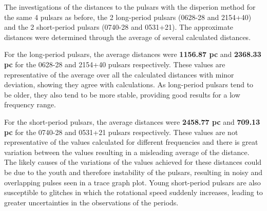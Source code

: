 \documentclass[12pt]{article}
\begin{document}
The investigations of the distances to the pulsars with the disperion method for the same 4 pulsars as before, the 2 long-period pulsars (0628-28 and 2154+40) and the 2 short-period pulsars (0740-28 and 0531+21). The approximate distances were determined through the average of several
calculated distances. 

For the long-period pulsars, the average distances were \textbf{1156.87 pc} and \textbf{2368.33 pc} for the 0628-28 and 2154+40 pulsars respectively. These values are representative of the average over all the calculated distances with minor deviation, showing they agree with calculations. As long-period pulsars tend to be older,
they also tend to be more stable, providing good results for a low frequency range.

For the short-period pulsars, the average distances were \textbf{2458.77 pc} and \textbf{709.13 pc} for the 0740-28 and 0531+21 pulsars respectively. These values are not representative of the values calculated for different frequencies and there is great variation between the values resulting in a misleading average of the distance.
The likely causes of the variations of the values achieved for these distances could be due to the youth and therefore instability of the pulsars, resulting in noisy and overlapping pulses seen in a trace graph plot. Young short-period pulsars are also susceptible to glitches in which the rotational speed suddenly increases, leading to greater uncertainties
in the observations of the periods. 

\newpage



 \label{sec:ref}

\vspace{1.5cm}

\listoffigures

\listoftables
\end{document}
